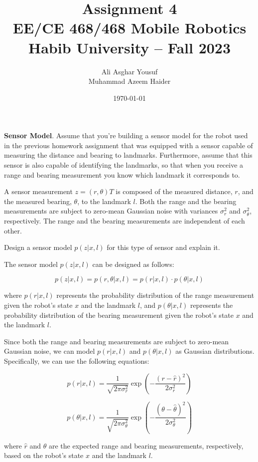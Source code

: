 \documentclass[answers]{exam}
\title{Assignment 4\\ EE/CE 468/468 Mobile Robotics\\ Habib University -- Fall 2023}
\author{Ali Asghar Yousuf \\ Muhammad Azeem Haider }
\date{\today}
\begin{document}
\maketitle

\begin{questions}
    \question[25]
    \textbf{Sensor Model}. Assume that you're building a sensor model for the robot used in the previous homework assignment that was equipped with a sensor capable of measuring the distance
    and bearing to landmarks. Furthermore, assume that this sensor is also capable of identifying
    the landmarks, so that when you receive a range and bearing measurement you know which
    landmark it corresponds to.

    A sensor measurement $z = (r, \theta)T$ is composed of the measured distance,
    $r$, and the measured bearing, $\theta$, to the landmark $l$. Both the range
    and the bearing measurements are subject to zero-mean Gaussian noise with
    variances $\sigma_r^2$ and $\sigma_\theta^2$, respectively. The range and the
    bearing measurements are independent of each other.

    Design a sensor model $p(z|x, l)$ for this type of sensor and explain it.

    \begin{solution}
        The sensor model $p(z|x, l)$ can be designed as follows:

        \[
            p(z|x, l) = p(r, \theta|x, l) = p(r|x, l) \cdot p(\theta|x, l)
        \]

        where $p(r|x, l)$ represents the probability distribution of the range
        measurement given the robot's state $x$ and the landmark $l$, and $p(\theta|x,
            l)$ represents the probability distribution of the bearing measurement given
        the robot's state $x$ and the landmark $l$.

        Since both the range and bearing measurements are subject to zero-mean Gaussian
        noise, we can model $p(r|x, l)$ and $p(\theta|x, l)$ as Gaussian distributions.
        Specifically, we can use the following equations:

        \[
            p(r|x, l) = \frac{1}{\sqrt{2\pi\sigma_r^2}} \exp\left(-\frac{(r - \hat{r})^2}{2\sigma_r^2}\right)
        \]

        \[
            p(\theta|x, l) = \frac{1}{\sqrt{2\pi\sigma_\theta^2}} \exp\left(-\frac{(\theta - \hat{\theta})^2}{2\sigma_\theta^2}\right)
        \]

        where $\hat{r}$ and $\hat{\theta}$ are the expected range and bearing
        measurements, respectively, based on the robot's state $x$ and the landmark
        $l$.


\end{solution}
\end{questions}
\end{document}
